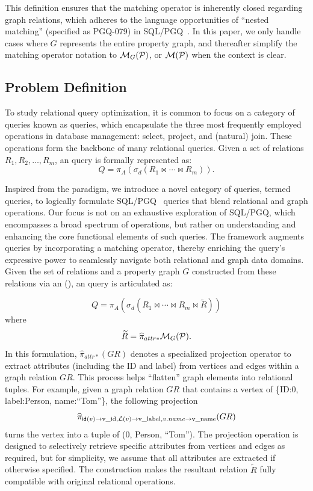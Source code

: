 This definition ensures that the matching operator is inherently closed regarding graph relations,
which adheres to the language opportunities of ``nested matching'' (specified as PGQ-079) in SQL/PGQ~\cite{sql-pgq}.
In this paper, we only handle cases where $G$ represents the entire property graph, and thereafter simplify the matching operator notation to $\mathcal{M}_G(\mathcal{P})$, or $\mathcal{M}(\mathcal{P})$ when the context is clear.

\subsection{Problem Definition}
\label{sec:problem-definition}

To study relational query optimization, it is common to focus on a category of queries known as \spj queries,
which encapsulate the three most frequently employed operations in database management: select, project, and (natural) join.
These operations form the backbone of many relational queries. Given a set of relations \(R_1, R_2, \ldots, R_m\),
an \spj query is formally represented as:
\[
Q = \pi_A(\sigma_d(R_1 \Join \cdots \Join R_m)).
\]

Inspired from the \spj paradigm, we introduce a novel category of queries, termed \spjm queries, to logically formulate SQL/PGQ~\cite{sql-pgq} queries that
blend relational and graph operations. Our focus is not on an exhaustive exploration of SQL/PGQ, which encompasses a broad spectrum of operations, but rather on understanding and enhancing the core functional elements of such queries.
The \spjm framework augments \spj queries by incorporating a matching operator, thereby enriching the query's expressive power to seamlessly navigate both relational and graph data domains.
Given the set of relations and a property graph \(G\) constructed from these relations via an \rgmapping (),
an \spjm query is articulated as:

\begin{equation}
    \label{eq:spjm}
Q = \pi_A(\sigma_d(R_1 \Join \cdots \Join R_m \Join \widetilde{R}))
\end{equation}
where
\[
\widetilde{R} = \widehat{\pi}_{attr*}\mathcal{M}_G(\mathcal{P}).
\]
In this formulation, \(\widehat{\pi}_{attr*}(GR)\) denotes a specialized projection operator to extract attributes (including the ID and label)
from vertices and edges within a graph relation $GR$.
This process helps ``flatten'' graph elements into relational tuples.
For example, given a graph relation $GR$ that contains a vertex of \{ID:0, label:Person, name:``Tom''\}, the
following projection
\[
\widehat{\pi}_{{\mathsf{id}}(v) \rightarrow \text{v\_id}, \mathcal{L}(v) \rightarrow \text{v\_label}, v.name \rightarrow \text{v\_name}}(GR)
\]
turns the vertex into a tuple of (0, Person, ``Tom'').
The projection operation is designed to selectively retrieve specific attributes from vertices and edges as required, but for simplicity, we assume that all attributes are extracted if otherwise specified.
The construction makes the resultant relation \(\tilde{R}\) fully compatible with original relational operations.

